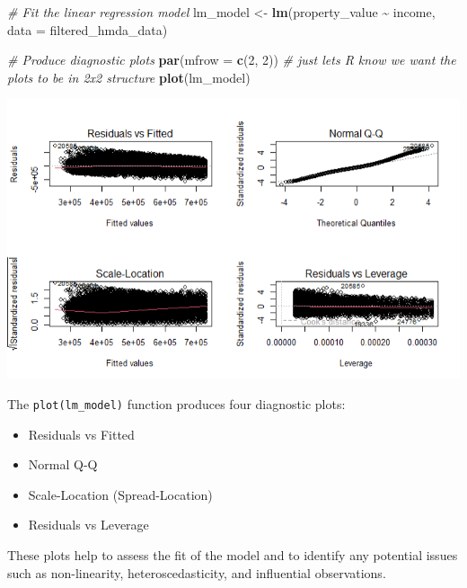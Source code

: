 \documentclass[
]{book}
\newenvironment{Shaded}{\begin{snugshade}}{\end{snugshade}}
\newcommand{\AttributeTok}[1]{\textcolor[rgb]{0.13,0.29,0.53}{#1}}
\newcommand{\CommentTok}[1]{\textcolor[rgb]{0.56,0.35,0.01}{\textit{#1}}}
\newcommand{\DecValTok}[1]{\textcolor[rgb]{0.00,0.00,0.81}{#1}}
\newcommand{\FunctionTok}[1]{\textcolor[rgb]{0.13,0.29,0.53}{\textbf{#1}}}
\newcommand{\NormalTok}[1]{#1}
\newcommand{\OtherTok}[1]{\textcolor[rgb]{0.56,0.35,0.01}{#1}}
\newcommand{\SpecialCharTok}[1]{\textcolor[rgb]{0.81,0.36,0.00}{\textbf{#1}}}
\begin{document}
\begin{Shaded}
\begin{Highlighting}[]
\CommentTok{\# Fit the linear regression model}
\NormalTok{lm\_model }\OtherTok{\textless{}{-}} \FunctionTok{lm}\NormalTok{(property\_value }\SpecialCharTok{\textasciitilde{}}\NormalTok{ income, }\AttributeTok{data =}\NormalTok{ filtered\_hmda\_data)}

\CommentTok{\# Produce diagnostic plots}
\FunctionTok{par}\NormalTok{(}\AttributeTok{mfrow =} \FunctionTok{c}\NormalTok{(}\DecValTok{2}\NormalTok{, }\DecValTok{2}\NormalTok{)) }\CommentTok{\# just lets R know we want the plots to be in 2x2 structure}
\FunctionTok{plot}\NormalTok{(lm\_model)}
\end{Highlighting}
\end{Shaded}

\includegraphics{images/diagnostic_plots.PNG}

The \texttt{plot(lm\_model)} function produces four diagnostic plots:

\begin{itemize}
\item
  Residuals vs Fitted
\item
  Normal Q-Q
\item
  Scale-Location (Spread-Location)
\item
  Residuals vs Leverage
\end{itemize}

These plots help to assess the fit of the model and to identify any potential issues such as non-linearity, heteroscedasticity, and influential observations.

  
\end{document}
